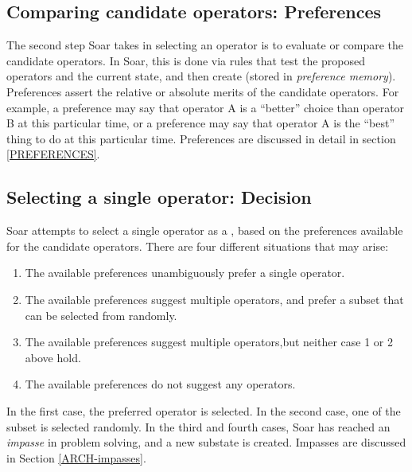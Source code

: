 \subsection{Comparing candidate operators: Preferences}

The second step Soar takes in selecting an operator is to evaluate or
compare the candidate operators. In Soar, this is done via rules that
test the proposed operators and the current state, and then create
 (stored in \emph{preference memory}).  Preferences assert the relative or absolute merits of the
candidate operators. For example, a preference may say that operator A
is a ``better'' choice than operator B at this particular time, or a
preference may say that operator A is the ``best'' thing to do at this
particular time. Preferences are discussed in detail in section \ref{PREFERENCES}. 

\subsection{Selecting a single operator: Decision}

Soar attempts to select a single operator as a , based on the preferences available
for the candidate operators. There are four different situations that may
arise:\vspace{-14pt}

\begin{enumerate}
\item The available preferences unambiguously prefer a single operator.\vspace{-
6pt}
\item The available preferences suggest multiple operators, and 
       prefer a subset that can be selected from randomly.\vspace{-6pt}
\item The available preferences suggest multiple operators,but neither case
       1 or 2 above hold.\vspace{-6pt}
\item The available preferences do not suggest any operators.
\end{enumerate}

In the first case, the preferred operator is selected.  In the second
case, one of the subset is selected randomly. In the third and fourth
cases, Soar has reached an \emph{impasse} in problem solving, and a new
substate is created.  Impasses are discussed in Section
\ref{ARCH-impasses}.

